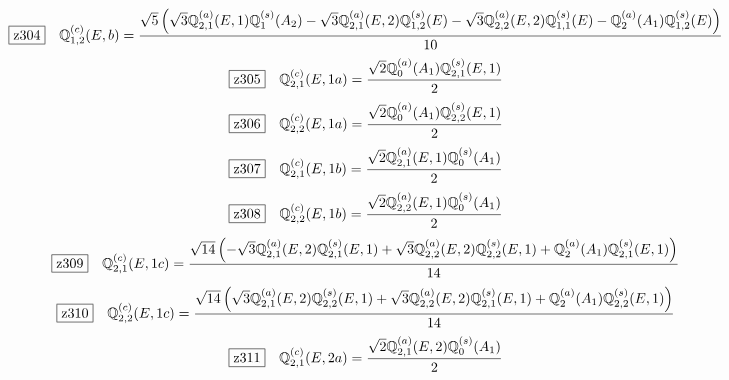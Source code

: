 \documentclass[fleqn,10pt,landscape]{jsarticle}
\begin{document}
\begin{dmath*}
\hspace*{3mm}\fbox{z304}\quad \mathbb{Q}_{1,2}^{(c)}(E,b)=\frac{\sqrt{5} \left(\sqrt{3} \mathbb{Q}_{2,1}^{(a)}(E,1) \mathbb{Q}_{1}^{(s)}(A_{2}) - \sqrt{3} \mathbb{Q}_{2,1}^{(a)}(E,2) \mathbb{Q}_{1,2}^{(s)}(E) - \sqrt{3} \mathbb{Q}_{2,2}^{(a)}(E,2) \mathbb{Q}_{1,1}^{(s)}(E) - \mathbb{Q}_{2}^{(a)}(A_{1}) \mathbb{Q}_{1,2}^{(s)}(E)\right)}{10}
\end{dmath*}
\begin{dmath*}
\hspace*{3mm}\fbox{z305}\quad \mathbb{Q}_{2,1}^{(c)}(E,1a)=\frac{\sqrt{2} \mathbb{Q}_{0}^{(a)}(A_{1}) \mathbb{Q}_{2,1}^{(s)}(E,1)}{2}
\end{dmath*}
\begin{dmath*}
\hspace*{3mm}\fbox{z306}\quad \mathbb{Q}_{2,2}^{(c)}(E,1a)=\frac{\sqrt{2} \mathbb{Q}_{0}^{(a)}(A_{1}) \mathbb{Q}_{2,2}^{(s)}(E,1)}{2}
\end{dmath*}
\begin{dmath*}
\hspace*{3mm}\fbox{z307}\quad \mathbb{Q}_{2,1}^{(c)}(E,1b)=\frac{\sqrt{2} \mathbb{Q}_{2,1}^{(a)}(E,1) \mathbb{Q}_{0}^{(s)}(A_{1})}{2}
\end{dmath*}
\begin{dmath*}
\hspace*{3mm}\fbox{z308}\quad \mathbb{Q}_{2,2}^{(c)}(E,1b)=\frac{\sqrt{2} \mathbb{Q}_{2,2}^{(a)}(E,1) \mathbb{Q}_{0}^{(s)}(A_{1})}{2}
\end{dmath*}
\begin{dmath*}
\hspace*{3mm}\fbox{z309}\quad \mathbb{Q}_{2,1}^{(c)}(E,1c)=\frac{\sqrt{14} \left(- \sqrt{3} \mathbb{Q}_{2,1}^{(a)}(E,2) \mathbb{Q}_{2,1}^{(s)}(E,1) + \sqrt{3} \mathbb{Q}_{2,2}^{(a)}(E,2) \mathbb{Q}_{2,2}^{(s)}(E,1) + \mathbb{Q}_{2}^{(a)}(A_{1}) \mathbb{Q}_{2,1}^{(s)}(E,1)\right)}{14}
\end{dmath*}
\begin{dmath*}
\hspace*{3mm}\fbox{z310}\quad \mathbb{Q}_{2,2}^{(c)}(E,1c)=\frac{\sqrt{14} \left(\sqrt{3} \mathbb{Q}_{2,1}^{(a)}(E,2) \mathbb{Q}_{2,2}^{(s)}(E,1) + \sqrt{3} \mathbb{Q}_{2,2}^{(a)}(E,2) \mathbb{Q}_{2,1}^{(s)}(E,1) + \mathbb{Q}_{2}^{(a)}(A_{1}) \mathbb{Q}_{2,2}^{(s)}(E,1)\right)}{14}
\end{dmath*}
\begin{dmath*}
\hspace*{3mm}\fbox{z311}\quad \mathbb{Q}_{2,1}^{(c)}(E,2a)=\frac{\sqrt{2} \mathbb{Q}_{2,1}^{(a)}(E,2) \mathbb{Q}_{0}^{(s)}(A_{1})}{2}
\end{dmath*}
\end{document}
